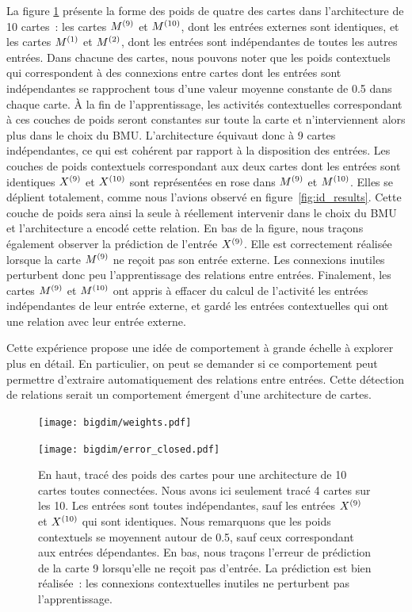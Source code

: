\documentclass[../main]{subfiles}
\begin{document}
La figure \ref{fig:bigdim} présente la forme des poids de quatre des cartes dans l'architecture de 10 cartes~: les cartes $M^{({9})}$ et $M^{({10})}$, dont les entrées externes sont identiques, et les cartes $M^{({1})}$ et $M^{({2})}$, dont les entrées sont indépendantes de toutes les autres entrées.
Dans chacune des cartes, nous pouvons noter que les poids contextuels qui correspondent à des connexions entre cartes dont les entrées sont indépendantes se rapprochent tous d'une valeur moyenne constante de 0.5 dans chaque carte. \`A la fin de l'apprentissage, les activités contextuelles correspondant à ces couches de poids seront constantes sur toute la carte et n'interviennent alors plus dans le choix du BMU.
L'architecture équivaut donc à 9 cartes indépendantes, ce qui est cohérent par rapport à la disposition des entrées. 
Les couches de poids contextuels correspondant aux deux cartes dont les entrées sont identiques $X^{({9})}$ et $X^{({10})}$ sont représentées en rose dans $M^{({9})}$ et $M^{({10})}$. 
Elles se déplient totalement, comme nous l'avions observé en figure~\ref{fig:id_results}. Cette couche de poids sera ainsi la seule à réellement intervenir dans le choix du BMU et l'architecture a encodé cette relation.
En bas de la figure, nous traçons également observer la prédiction de l'entrée $X^{({9})}$. 
Elle est correctement réalisée lorsque la carte $M^{({9})}$ ne reçoit pas son entrée externe. Les connexions \og inutiles \fg{} perturbent donc peu l'apprentissage des relations entre entrées. 
Finalement, les cartes $M^{({9})}$ et $M^{({10})}$ ont appris à effacer du calcul de l'activité les entrées indépendantes de leur entrée externe, et gardé les entrées contextuelles qui ont une relation avec leur entrée externe.

Cette expérience propose une idée de comportement à grande échelle à explorer plus en détail.
En particulier, on peut se demander si ce comportement peut permettre d'extraire automatiquement des relations entre entrées. Cette détection de relations serait un comportement émergent d'une architecture de cartes.

\begin{figure}
	\begin{minipage}{\textwidth}
	\texttt{[image: bigdim/weights.pdf]}
	\end{minipage}
\begin{minipage}{\textwidth}
	\centering\texttt{[image: bigdim/error\_closed.pdf]}
	\caption{En haut, tracé des poids des cartes pour une architecture de 10 cartes toutes connectées. Nous avons ici seulement tracé 4 cartes sur les 10. Les entrées sont toutes indépendantes, sauf les entrées $X^{({9})}$ et $X^{({10})}$ qui sont identiques. Nous remarquons que les poids contextuels se moyennent autour de 0.5, sauf ceux correspondant aux entrées dépendantes. En bas, nous traçons l'erreur de prédiction de la carte 9 lorsqu'elle ne reçoit pas d'entrée. La prédiction est bien réalisée~: les connexions contextuelles inutiles ne perturbent pas l'apprentissage. \label{fig:bigdim}}
\end{minipage}
\end{figure}
\end{document}
